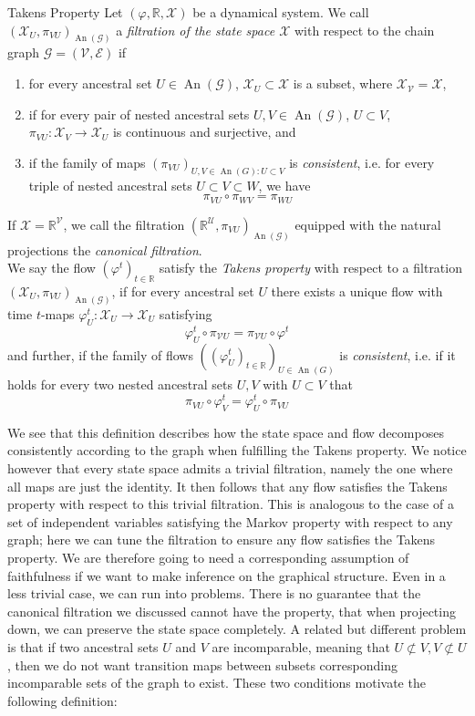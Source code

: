 \documentclass[11pt, a4paper]{memoir}
\theoremstyle{break}
\theoremstyle{break}
\theoremstyle{nonumberplain}
\newcommand{\mR}{\mathbb{R}}
\DeclareMathOperator{\an}{An}
\begin{document}
\begin{mydefinition}{Takens Property}
Let $(\varphi,\mR,\mathcal{X})$ be a dynamical system. We call $(\mathcal{X}_U,\pi_{VU})_{\an(\mathcal{G})}$ a \emph{filtration of the state space $\mathcal{X}$} with respect to the chain graph $\mathcal{G}=(\mathcal{V},\mathcal{E})$ if
\begin{enumerate}[label=\roman*)]
\item for every ancestral set $U\in \an(\mathcal{G})$, $\mathcal{X}_U\subset \mathcal{X}$ is a subset, where $\mathcal{X}_{\mathcal{V}}=\mathcal{X}$,
\item if for every pair of nested ancestral sets $U,V\in \an(\mathcal{G})$, $U\subset V$, $\pi_{VU}:\mathcal{X}_V\to \mathcal{X}_U$ is continuous and surjective, and
\item if the family of maps $(\pi_{VU})_{U,V\in \an(G): U\subset V}$ is \emph{consistent}, i.e. for every triple of nested ancestral sets $U\subset V\subset W$, we have
$$\pi_{VU}\circ \pi_{WV}=\pi_{WU}$$
\end{enumerate}
If $\mathcal{X}=\mR^\mathcal{V}$, we call the filtration $(\mR^{\mathcal{U}},\pi_{VU})_{\an(\mathcal{G})}$ equipped with the natural projections the \emph{canonical filtration}.\\[5pt]
We say the flow $(\varphi^t)_{t\in \mR}$ satisfy the \emph{Takens property} with respect to a filtration $(\mathcal{X}_U,\pi_{VU})_{\an(\mathcal{G})}$, if for every ancestral set $U$ there exists a unique flow with time $t$-maps $\varphi^t_U: \mathcal{X}_U\to\mathcal{X}_U$ satisfying
$$\varphi^t_{U}\circ \pi_{\mathcal{V}U}=\pi_{\mathcal{V}U}\circ \varphi^t$$
and further, if the family of flows $((\varphi_U^t)_{t\in \mR})_{U\in \an(G)}$ is \emph{consistent}, i.e. if it holds for every two nested ancestral sets $U,V$ with $U\subset V$ that
$$\pi_{VU}\circ\varphi_V^t=\varphi_U^t\circ \pi_{VU}$$
\end{mydefinition}
We see that this definition describes how the state space and flow decomposes consistently according to the graph when fulfilling the Takens property. We notice however that every state space admits a trivial filtration, namely the one where all maps are just the identity. It then follows that any flow satisfies the Takens property with respect to this trivial filtration. This is analogous to the case of a set of independent variables satisfying the Markov property with respect to any graph; here we can tune the filtration to ensure any flow satisfies the Takens property. We are therefore going to need a corresponding assumption of faithfulness if we want to make inference on the graphical structure. Even in a less trivial case, we can run into problems. There is no guarantee that the canonical filtration we discussed cannot have the property, that when projecting down, we can preserve the state space completely. A related but different problem is that if two ancestral sets $U$ and $V$ are incomparable, meaning that $U\not\subset V, V\not\subset U$, then we do not want transition maps between subsets corresponding incomparable sets of the graph to exist. These two conditions motivate the following definition:
\end{document}

